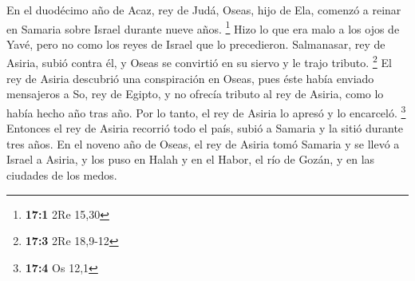  En el duodécimo año de Acaz, rey de Judá, Oseas, hijo de
Ela, comenzó a reinar en Samaria sobre Israel durante nueve años.
\footnote{\textbf{17:1} 2Re 15,30}  Hizo lo que era malo a
los ojos de Yavé, pero no como los reyes de Israel que lo precedieron.
 Salmanasar, rey de Asiria, subió contra él, y Oseas se
convirtió en su siervo y le trajo tributo. \footnote{\textbf{17:3} 2Re
  18,9-12}  El rey de Asiria descubrió una conspiración en
Oseas, pues éste había enviado mensajeros a So, rey de Egipto, y no
ofrecía tributo al rey de Asiria, como lo había hecho año tras año. Por
lo tanto, el rey de Asiria lo apresó y lo encarceló. \footnote{\textbf{17:4}
  Os 12,1}  Entonces el rey de Asiria recorrió todo el
país, subió a Samaria y la sitió durante tres años.  En el
noveno año de Oseas, el rey de Asiria tomó Samaria y se llevó a Israel a
Asiria, y los puso en Halah y en el Habor, el río de Gozán, y en las
ciudades de los medos.

